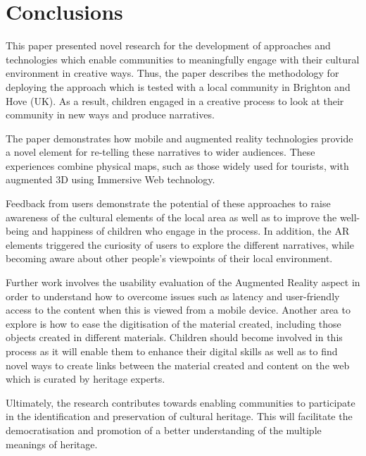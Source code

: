 \documentclass[acmlarge,screen,dvipsnames]{acmart}
\begin{document}
\section{Conclusions} \label{conc} This paper presented novel research for the
development of approaches and technologies which enable communities to
meaningfully engage with their cultural environment in creative ways. Thus,
the paper describes the methodology for deploying the approach which is tested
with a local community in Brighton and Hove (UK). As a result, children
engaged in a creative process to look at their community in new ways and
produce narratives.

The paper demonstrates how mobile and augmented reality technologies provide a
novel element for re-telling these narratives to wider audiences. These
experiences combine physical maps, such as those widely used for tourists,
with augmented 3D using Immersive Web technology. 

Feedback from users demonstrate the potential of these approaches to raise
awareness of the cultural elements of the local area as well as to improve the
well-being and happiness of children who engage in the process. In addition,
the AR elements triggered the curiosity of users to explore the different
narratives, while becoming aware about other people's viewpoints of their local
environment.

Further work involves the usability evaluation of the Augmented Reality aspect
in order to understand how to overcome issues such as latency and
user-friendly access to the content when this is viewed from a mobile device.
Another area to explore is how to ease the digitisation of the material
created, including those objects created in different materials. Children should
become involved in this process as it will enable them to enhance their digital
skills as well as to find novel ways to create links between the material created and
content on the web which is curated by heritage experts. 



Ultimately, the research contributes towards enabling communities to
participate in the identification and preservation of cultural heritage. This will 
 facilitate the democratisation and promotion of a better understanding
of the multiple meanings of heritage.
\end{document}
